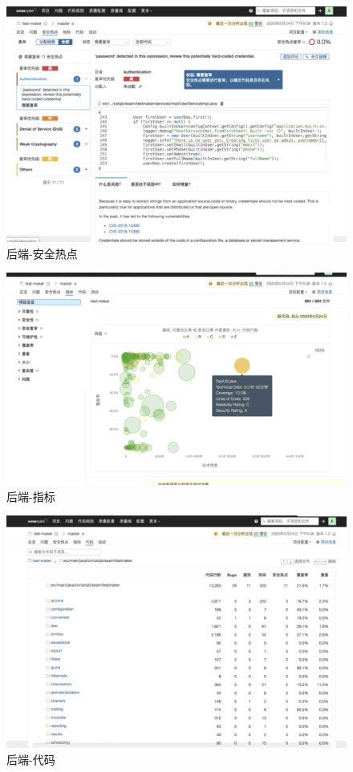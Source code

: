 \documentclass[hyperref, a4paper]{ctexart}
\begin{document}
\begin{figure}
\centering
\includegraphics{screenshots/lab7-pic/back-3.png}
\caption{后端-安全热点}
\end{figure}

\begin{figure}
\centering
\includegraphics{screenshots/lab7-pic/back-5.png}
\caption{后端-指标}
\end{figure}

\begin{figure}
\centering
\includegraphics{screenshots/lab7-pic/back-6.png}
\caption{后端-代码}
\end{figure}
\end{document}

